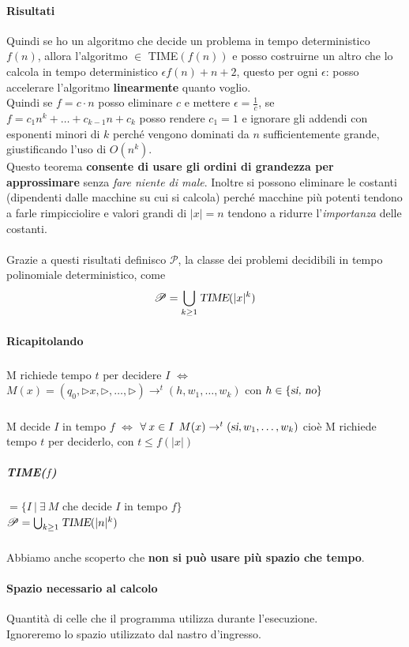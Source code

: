 \documentclass[10pt]{book}
\begin{document}
\paragraph{Risultati} Quindi se ho un algoritmo che decide un problema in tempo deterministico $f(n)$, allora l'algoritmo $\in$ TIME$(f(n))$ e posso costruirne un altro che lo calcola in tempo deterministico $\epsilon f(n) + n + 2$, questo per ogni $\epsilon$: posso accelerare l'algoritmo \textbf{linearmente} quanto voglio.\\
Quindi se $f = c\cdot n$ posso eliminare $c$ e mettere $\epsilon = \frac{1}{c}$, se $f = c_1n^k + \ldots + c_{k-1}n + c_k$ posso rendere $c_1 = 1$ e ignorare gli addendi con esponenti minori di $k$ perché vengono dominati da $n$ sufficientemente grande, giustificando l'uso di $O(n^k)$.\\
Questo teorema \textbf{consente di usare gli ordini di grandezza per approssimare} senza \textit{fare niente di male}. Inoltre si possono eliminare le costanti (dipendenti dalle macchine su cui si calcola) perché macchine più potenti tendono a farle rimpicciolire e valori grandi di $|x| = n$ tendono a ridurre l'\textit{importanza} delle costanti.
\paragraph{} Grazie a questi risultati definisco $\mathscr{P}$, la classe dei problemi decidibili in tempo polinomiale deterministico, come $$\mathscr{P} = \bigcup_{k \geq 1} \textsl{TIME}(|x|^k) $$
\paragraph{Ricapitolando}
\subparagraph{} M richiede tempo $t$ per decidere $I$ $\Leftrightarrow$ $M(x) = (q_0, \triangleright x, \triangleright, \ldots, \triangleright) \rightarrow^t (h, w_1, \ldots, w_k)$ con $h \in \{\textsl{si, no}\}$
\subparagraph{} M decide $I$ in tempo $f$ $\Leftrightarrow$ $\forall\:x\in I\:\:M(x) \rightarrow^t (\textsl{si}, w_1, \ldots, w_k)$ cioè M richiede tempo $t$ per deciderlo, con $t \leq f(|x|)$
\subparagraph{TIME($f$)} $=\{I\:|\:\exists\: M$ che decide $I$ in tempo $f\}$\\
$\mathscr{P} = \bigcup_{k \geq 1} \textsl{TIME}(|n|^k)$
\subparagraph{}Abbiamo anche scoperto che \textbf{non si può usare più spazio che tempo}.
\paragraph{Spazio necessario al calcolo} Quantità di celle che il programma utilizza durante l'esecuzione.\\
Ignoreremo lo spazio utilizzato dal nastro d'ingresso.
\end{document}
